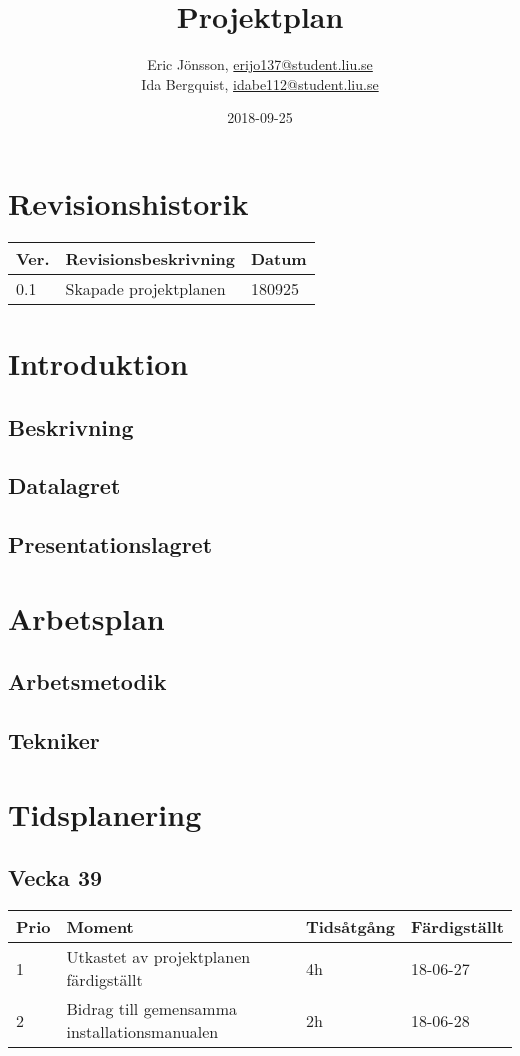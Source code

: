 \documentclass{TDP003mall}
\author{Eric Jönsson, \url{erijo137@student.liu.se}\\
  Ida Bergquist, \url{idabe112@student.liu.se}}
\title{Projektplan}
\date{2018-09-25}
\begin{document}
\projectpage
\tableofcontents
\newpage
\section{Revisionshistorik}
\begin{table}[!h]
\begin{tabularx}{\linewidth}{|l|X|l|}
\hline
\textbf{Ver.} & \textbf{Revisionsbeskrivning} & \textbf{Datum} \\\hline
0.1 & Skapade projektplanen & 180925 \\\hline
\end{tabularx}
\end{table}

\section{Introduktion}
\subsection{Beskrivning}
\subsection{Datalagret}
\subsection{Presentationslagret}

\section{Arbetsplan}
\subsection{Arbetsmetodik}
\subsection{Tekniker}

\section{Tidsplanering}

\subsection{Vecka 39}
\begin{table}[!h]
\begin{tabularx}{\linewidth}{|l|X|l|l|}
\hline
\textbf{Prio} & \textbf{Moment} & \textbf{Tidsåtgång} & \textbf{Färdigställt}\\\hline
1& Utkastet av projektplanen färdigställt & 4h	& 18-06-27 \\\hline
2& Bidrag till gemensamma installationsmanualen & 2h &  18-06-28 \\\hline

\end{tabularx}
\end{table}
\newpage
\end{document}

